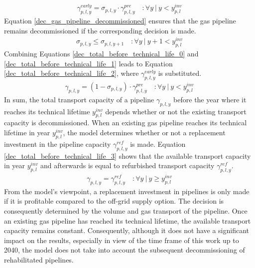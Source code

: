 \begin{align}\label{dec_total_before_technical_life_1}
	\gamma^{early}_{p,l, y} = \sigma_{p,l,y} \cdot \gamma^{pre}_{p,l,y} \quad:\forall y~|~y<y^{inv}_{p,l}
\end{align}
Equation \ref{dec_gas_pipeline_decommissioned} ensures that the gas pipeline remains decommissioned if the corresponding decision is made.
\begin{align}\label{dec_gas_pipeline_decommissioned}
	\sigma_{p,l,y} \leq \sigma_{p,l,y+1} \quad:\forall y~|~y+1<y^{inv}_{p,l}
\end{align}
Combining Equations \ref{dec_total_before_technical_life_0} and \ref{dec_total_before_technical_life_1} leads to Equation \ref{dec_total_before_technical_life_2}, where $\gamma^{early}_{p,l, y}$ is substituted. 
\begin{align}\label{dec_total_before_technical_life_2}
	\gamma_{p,l, y} = (1-\sigma_{p,l,y}) \cdot \gamma^{pre}_{p,l, y} \quad:\forall y~|~y<y^{inv}_{p,l}
\end{align}
In sum, the total transport capacity of a pipeline $\gamma_{p,l, y}$ before the year where it reaches its technical lifetime $y^{inv}_{p,l}$ depends whether or not the existing transport capacity is decommissioned. When an existing gas pipeline reaches its technical lifetime in year $y^{inv}_{p,l}$, the model determines whether or not a replacement investment in the pipeline capacity $\gamma^{ref}_{p,l, y}$ is made. Equation \ref{dec_total_before_technical_life_3} shows that the available transport capacity in year $y^{inv}_{p,l}$ and afterwards is equal to refurbished transport capacity $\gamma^{ref}_{p,l, y}$. 
\begin{align}\label{dec_total_before_technical_life_3}
	\gamma_{p,l, y} = \gamma^{ref}_{p,l, y} \quad:\forall y~|~y \geq y^{inv}_{p,l}
\end{align}
From the model's viewpoint, a replacement investment in pipelines is only made if it is profitable compared to the off-grid supply option. The decision is consequently determined by the volume and gas transport of the pipeline. Once an existing gas pipeline has reached its technical lifetime, the available transport capacity remains constant. Consequently, although it does not have a significant impact on the results, especially in view of the time frame of this work up to 2040, the model does not take into account the subsequent decommissioning of rehabilitated pipelines.

